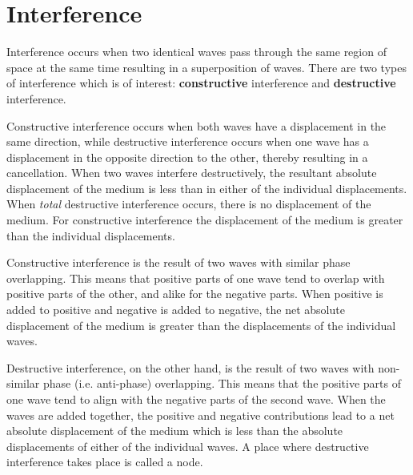 \section{Interference}

Interference occurs when two identical waves pass through the same region of space at the same time resulting in a superposition of waves. There are two types of interference which is of interest: \textbf{constructive} interference and \textbf{destructive} interference. 

Constructive interference occurs when both waves have a displacement in the same direction, while destructive interference occurs when one wave has a displacement in the opposite direction to the other, thereby resulting in a cancellation. When two waves interfere destructively, the resultant absolute displacement of the medium is less than in either of the individual displacements. When \textit{total} destructive interference occurs, there is no displacement of the medium. For constructive interference the displacement of the medium is greater than the individual displacements. 

Constructive interference is the result of two waves with similar phase overlapping. This means that positive parts of one wave tend to overlap with positive parts of the other, and alike for the negative parts. When positive is added to positive and negative is added to negative, the net absolute displacement of the medium is greater than the displacements of the individual waves.

Destructive interference, on the other hand, is the result of two waves with non-similar phase (i.e. anti-phase) overlapping. This means that the positive parts of one wave tend to align with the negative parts of the second wave. When the waves are added together, the positive and negative contributions lead to a net absolute displacement of the medium which is less than the absolute displacements of either of the individual waves. A place where destructive interference takes place is called a node.

